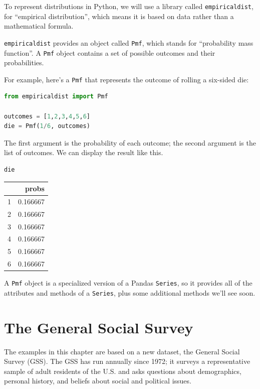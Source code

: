 To represent distributions in Python, we will use a library called
\passthrough{\lstinline!empiricaldist!}, for ``empirical distribution'',
which means it is based on data rather than a mathematical formula.

\passthrough{\lstinline!empiricaldist!} provides an object called
\passthrough{\lstinline!Pmf!}, which stands for ``probability mass
function''. A \passthrough{\lstinline!Pmf!} object contains a set of
possible outcomes and their probabilities.

For example, here's a \passthrough{\lstinline!Pmf!} that represents the
outcome of rolling a six-sided die:

\begin{lstlisting}[language=Python,style=source]
from empiricaldist import Pmf

outcomes = [1,2,3,4,5,6]
die = Pmf(1/6, outcomes)
\end{lstlisting}

The first argument is the probability of each outcome; the second
argument is the list of outcomes. We can display the result like this.

\begin{lstlisting}[language=Python,style=source]
die
\end{lstlisting}

\begin{tabular}{lr}
\toprule
{} &     probs \\
\midrule
1 &  0.166667 \\
2 &  0.166667 \\
3 &  0.166667 \\
4 &  0.166667 \\
5 &  0.166667 \\
6 &  0.166667 \\
\bottomrule
\end{tabular}

A \passthrough{\lstinline!Pmf!} object is a specialized version of a
Pandas \passthrough{\lstinline!Series!}, so it provides all of the
attributes and methods of a \passthrough{\lstinline!Series!}, plus some
additional methods we'll see soon.

\hypertarget{the-general-social-survey}{%
\section{The General Social Survey}\label{the-general-social-survey}}

The examples in this chapter are based on a new dataset, the General
Social Survey (GSS). The GSS has run annually since 1972; it surveys a
representative sample of adult residents of the U.S. and asks questions
about demographics, personal history, and beliefs about social and
political issues.

